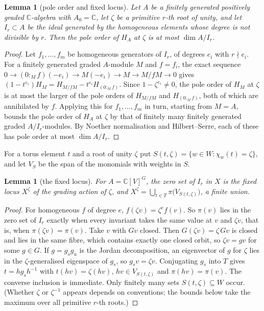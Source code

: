\documentclass[11pt]{amsart}
\newtheorem{lemma}[theorem]{Lemma}
\theoremstyle{definition}
\theoremstyle{remark}
\newcommand{\C}{\mathbb{C}}
\begin{document}
\begin{lemma}[pole order and fixed locus]\label{lem:pole}
Let $A$ be a finitely generated positively graded $\C$-algebra with $A_0=\C$, let $\zeta$ be a primitive $r$-th root of unity, and let $I_r\subset A$ be the ideal generated by the homogeneous elements whose degree is not divisible by $r$. Then the pole order of $H_A$ at $\zeta$ is at most $\dim A/I_r$.
\end{lemma}
\begin{proof}
Let $f_1,\dots,f_m$ be homogeneous generators of $I_r$, of degrees $e_i$ with $r\nmid e_i$. For a finitely generated graded $A$-module $M$ and $f=f_i$, the exact sequence $0\to(0:_Mf)(-e_i)\to M(-e_i)\to M\to M/fM\to0$ gives $(1-t^{e_i})H_M=H_{M/fM}-t^{e_i}H_{(0:_Mf)}$. Since $1-\zeta^{e_i}\ne0$, the pole order of $H_M$ at $\zeta$ is at most the larger of the pole orders of $H_{M/fM}$ and $H_{(0:_Mf)}$, both of which are annihilated by $f$. Applying this for $f_1,\dots,f_m$ in turn, starting from $M=A$, bounds the pole order of $H_A$ at $\zeta$ by that of finitely many finitely generated graded $A/I_r$-modules. By Noether normalisation and Hilbert--Serre, each of these has pole order at most $\dim A/I_r$.
\end{proof}

For a torus element $t$ and a root of unity $\zeta$ put $S(t,\zeta)=\{w\in W:\chi_w(t)=\zeta\}$, and let $V_S$ be the span of the monomials with weights in $S$.

\begin{lemma}[the fixed locus]\label{lem:fixed}
For $A=\C[V]^G$, the zero set of $I_r$ in $X$ is the fixed locus $X^\zeta$ of the grading action of $\zeta$, and
$X^\zeta=\bigcup_{t\in T}\pi\bigl(V_{S(t,\zeta)}\bigr)$, a finite union.
\end{lemma}
\begin{proof}
For homogeneous $f$ of degree $e$, $f(\zeta v)=\zeta^ef(v)$. So $\pi(v)$ lies in the zero set of $I_r$ exactly when every invariant takes the same value at $v$ and $\zeta v$, that is, when $\pi(\zeta v)=\pi(v)$. Take $v$ with $Gv$ closed. Then $G(\zeta v)=\zeta\,Gv$ is closed and lies in the same fibre, which contains exactly one closed orbit, so $\zeta v=gv$ for some $g\in G$. If $g=g_sg_u$ is the Jordan decomposition, an eigenvector of $g$ for $\zeta$ lies in the $\zeta$-generalised eigenspace of $g_s$, so $g_sv=\zeta v$. Conjugating $g_s$ into $T$ gives $t=hg_sh^{-1}$ with $t(hv)=\zeta(hv)$, $hv\in V_{S(t,\zeta)}$ and $\pi(hv)=\pi(v)$. The converse inclusion is immediate. Only finitely many sets $S(t,\zeta)\subseteq W$ occur. (Whether $\zeta$ or $\zeta^{-1}$ appears depends on conventions; the bounds below take the maximum over all primitive $r$-th roots.)
\end{proof}
\end{document}
